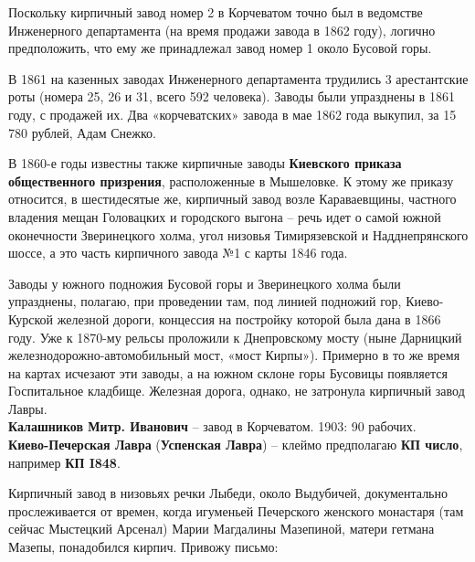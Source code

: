 Поскольку кирпичный завод номер 2 в Корчеватом точно был в ведомстве Инженерного департамента (на время продажи завода в 1862 году), логично предположить, что ему же принадлежал завод номер 1 около Бусовой горы.

В 1861 на казенных заводах Инженерного департамента трудились 3 арестантские роты (номера 25, 26 и 31, всего 592 человека). Заводы были упразднены в 1861 году, с продажей их. Два «корчеватских» завода в мае 1862 года выкупил, за 15 780 рублей, Адам Снежко.

В 1860-е годы известны также кирпичные заводы \textbf{Киевского приказа общественного призрения}, расположенные в Мышеловке. К этому же приказу относится, в шестидесятые же, кирпичный завод возле Караваевщины, частного владения мещан Головацких и городского выгона – речь идет о самой южной оконечности Зверинецкого холма, угол низовья Тимирязевской и Надднепрянского шоссе, а это часть кирпичного завода №1 с карты 1846 года.

Заводы у южного подножия Бусовой горы и Зверинецкого холма были упразднены, полагаю, при проведении там, под линией подножий гор, Киево-Курской железной дороги, концессия на постройку которой была дана в 1866 году. Уже к 1870-му рельсы проложили к Днепровскому мосту (ныне Дарницкий железнодорожно-автомобильный мост, «мост Кирпы»). Примерно в то же время на картах исчезают эти заводы, а на южном склоне горы Бусовицы появляется Госпитальное кладбище. Железная дорога, однако, не затронула кирпичный завод Лавры.\\

\noindent\textbf{Калашников Митр. Иванович} – завод в Корчеватом. 1903: 90 рабочих.\\


\noindent\textbf{Киево-Печерская Лавра} (\textbf{Успенская Лавра}) – клеймо предполагаю \textbf{КП число}, например \textbf{КП I848}.

Кирпичный завод в низовьях речки Лыбеди, около Выдубичей, документально прослеживается от времен, когда игуменьей Печерского женского монастаря (там сейчас Мыстецкий Арсенал) Марии Магдалины Мазепиной, матери гетмана Мазепы, понадобился кирпич. Привожу письмо:

